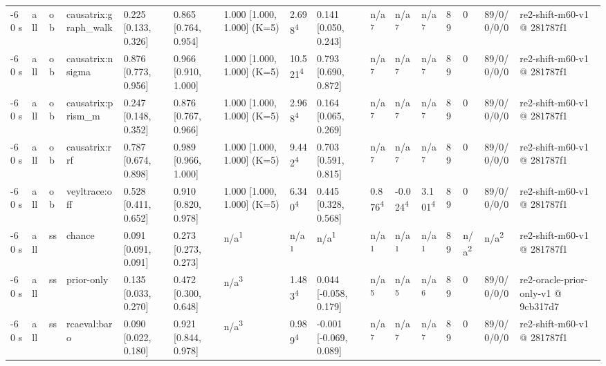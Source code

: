 \begin{table}[t]
\begin{tabular}{llllllllllllllll}
-60 s & all & ob & causatrix:graph\_walk & 0.225 [0.133, 0.326] & 0.865 [0.764, 0.954] & 1.000 [1.000, 1.000] (K=5) & 2.698\textsuperscript{4} & 0.141 [0.050, 0.243] & n/a\textsuperscript{7} & n/a\textsuperscript{7} & n/a\textsuperscript{7} & 89 & 0 & 89/0/0/0/0 & re2-shift-m60-v1 @ 281787f1 \\
-60 s & all & ob & causatrix:nsigma & 0.876 [0.773, 0.956] & 0.966 [0.910, 1.000] & 1.000 [1.000, 1.000] (K=5) & 10.521\textsuperscript{4} & 0.793 [0.690, 0.872] & n/a\textsuperscript{7} & n/a\textsuperscript{7} & n/a\textsuperscript{7} & 89 & 0 & 89/0/0/0/0 & re2-shift-m60-v1 @ 281787f1 \\
-60 s & all & ob & causatrix:prism\_m & 0.247 [0.148, 0.352] & 0.876 [0.767, 0.966] & 1.000 [1.000, 1.000] (K=5) & 2.968\textsuperscript{4} & 0.164 [0.065, 0.269] & n/a\textsuperscript{7} & n/a\textsuperscript{7} & n/a\textsuperscript{7} & 89 & 0 & 89/0/0/0/0 & re2-shift-m60-v1 @ 281787f1 \\
-60 s & all & ob & causatrix:rrf & 0.787 [0.674, 0.898] & 0.989 [0.966, 1.000] & 1.000 [1.000, 1.000] (K=5) & 9.442\textsuperscript{4} & 0.703 [0.591, 0.815] & n/a\textsuperscript{7} & n/a\textsuperscript{7} & n/a\textsuperscript{7} & 89 & 0 & 89/0/0/0/0 & re2-shift-m60-v1 @ 281787f1 \\
-60 s & all & ob & veyltrace:off & 0.528 [0.411, 0.652] & 0.910 [0.820, 0.978] & 1.000 [1.000, 1.000] (K=5) & 6.340\textsuperscript{4} & 0.445 [0.328, 0.568] & 0.876\textsuperscript{4} & -0.024\textsuperscript{4} & 3.101\textsuperscript{4} & 89 & 0 & 89/0/0/0/0 & re2-shift-m60-v1 @ 281787f1 \\
-60 s & all & ss & chance & 0.091 [0.091, 0.091] & 0.273 [0.273, 0.273] & n/a\textsuperscript{1} & n/a\textsuperscript{1} & n/a\textsuperscript{1} & n/a\textsuperscript{1} & n/a\textsuperscript{1} & n/a\textsuperscript{1} & 89 & n/a\textsuperscript{2} & n/a\textsuperscript{2} & re2-shift-m60-v1 @ 281787f1 \\
-60 s & all & ss & prior-only & 0.135 [0.033, 0.270] & 0.472 [0.300, 0.648] & n/a\textsuperscript{3} & 1.483\textsuperscript{4} & 0.044 [-0.058, 0.179] & n/a\textsuperscript{5} & n/a\textsuperscript{5} & n/a\textsuperscript{6} & 89 & 0 & 89/0/0/0/0 & re2-oracle-prior-only-v1 @ 9cb317d7 \\
-60 s & all & ss & rcaeval:baro & 0.090 [0.022, 0.180] & 0.921 [0.844, 0.978] & n/a\textsuperscript{3} & 0.989\textsuperscript{4} & -0.001 [-0.069, 0.089] & n/a\textsuperscript{7} & n/a\textsuperscript{7} & n/a\textsuperscript{7} & 89 & 0 & 89/0/0/0/0 & re2-shift-m60-v1 @ 281787f1 \\

\end{tabular}
\end{table}
